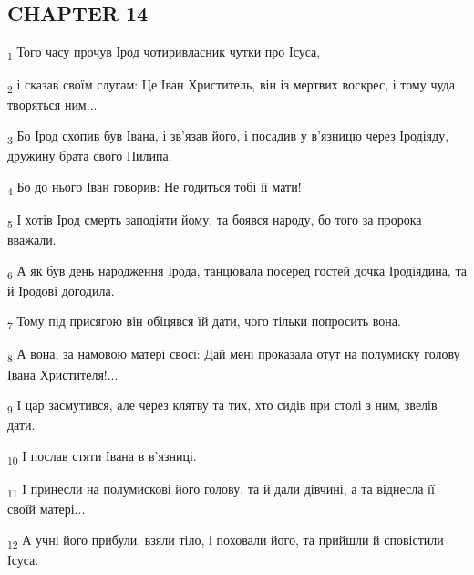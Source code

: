 \subsection{CHAPTER 14}
\begin{tcolorbox}
\textsubscript{1} Того часу прочув Ірод чотиривласник чутки про Ісуса,
\end{tcolorbox}
\begin{tcolorbox}
\textsubscript{2} і сказав своїм слугам: Це Іван Христитель, він із мертвих воскрес, і тому чуда творяться ним...
\end{tcolorbox}
\begin{tcolorbox}
\textsubscript{3} Бо Ірод схопив був Івана, і зв'язав його, і посадив у в'язницю через Іродіяду, дружину брата свого Пилипа.
\end{tcolorbox}
\begin{tcolorbox}
\textsubscript{4} Бо до нього Іван говорив: Не годиться тобі її мати!
\end{tcolorbox}
\begin{tcolorbox}
\textsubscript{5} І хотів Ірод смерть заподіяти йому, та боявся народу, бо того за пророка вважали.
\end{tcolorbox}
\begin{tcolorbox}
\textsubscript{6} А як був день народження Ірода, танцювала посеред гостей дочка Іродіядина, та й Іродові догодила.
\end{tcolorbox}
\begin{tcolorbox}
\textsubscript{7} Тому під присягою він обіцявся їй дати, чого тільки попросить вона.
\end{tcolorbox}
\begin{tcolorbox}
\textsubscript{8} А вона, за намовою матері своєї: Дай мені проказала отут на полумиску голову Івана Христителя!...
\end{tcolorbox}
\begin{tcolorbox}
\textsubscript{9} І цар засмутився, але через клятву та тих, хто сидів при столі з ним, звелів дати.
\end{tcolorbox}
\begin{tcolorbox}
\textsubscript{10} І послав стяти Івана в в'язниці.
\end{tcolorbox}
\begin{tcolorbox}
\textsubscript{11} І принесли на полумискові його голову, та й дали дівчині, а та віднесла її своїй матері...
\end{tcolorbox}
\begin{tcolorbox}
\textsubscript{12} А учні його прибули, взяли тіло, і поховали його, та прийшли й сповістили Ісуса.
\end{tcolorbox}
